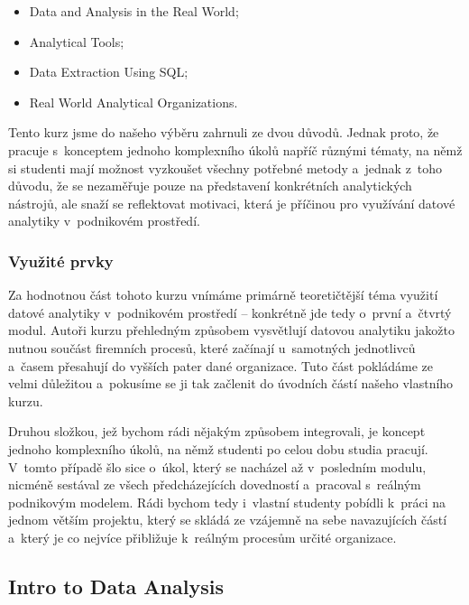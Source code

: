 \begin{itemize}
\tightlist
\item
  Data and Analysis in the Real World;
\item
  Analytical Tools;
\item
  Data Extraction Using SQL;
\item
  Real World Analytical Organizations.
\end{itemize}

Tento kurz jsme do našeho výběru zahrnuli ze dvou důvodů. Jednak proto, že pracuje s~konceptem jednoho komplexního úkolů napříč různými tématy, na němž si studenti mají možnost vyzkoušet všechny potřebné metody a~jednak z~toho důvodu, že se nezaměřuje pouze na představení konkrétních analytických nástrojů, ale snaží se reflektovat motivaci, která je příčinou pro využívání datové analytiky v~podnikovém prostředí.

\hypertarget{vyuux17eituxe9-prvky}{%
\subsubsection{Využité prvky}\label{vyuux17eituxe9-prvky}}

Za hodnotnou část tohoto kurzu vnímáme primárně teoretičtější téma využití datové analytiky v~podnikovém prostředí -- konkrétně jde tedy o~první a~čtvrtý modul. Autoři kurzu přehledným způsobem vysvětlují datovou analytiku jakožto nutnou součást firemních procesů, které začínají u~samotných jednotlivců a~časem přesahují do vyšších pater dané organizace. Tuto část pokládáme ze velmi důležitou a~pokusíme se ji tak začlenit do úvodních částí našeho vlastního kurzu.

Druhou složkou, jež bychom rádi nějakým způsobem integrovali, je koncept jednoho komplexního úkolů, na němž studenti po celou dobu studia pracují. V~tomto případě šlo sice o~úkol, který se nacházel až v~posledním modulu, nicméně sestával ze všech předcházejících dovedností a~pracoval s~reálným podnikovým modelem. Rádi bychom tedy i~vlastní studenty pobídli k~práci na jednom větším projektu, který se skládá ze vzájemně na sebe navazujících částí a~který je co nejvíce přibližuje k~reálným procesům určité organizace.

\hypertarget{intro-to-data-analysis}{%
\subsection{Intro to Data Analysis}\label{intro-to-data-analysis}}


